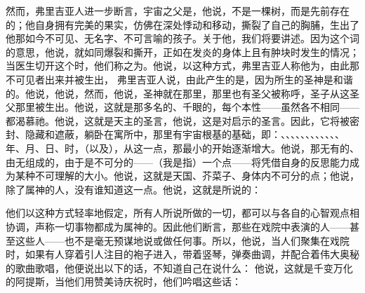 然而，弗里吉亚人进一步断言，宇宙之父是，他说，不是一棵树，而是先前存在的；他自身拥有完美的果实，仿佛在深处悸动和移动，撕裂了自己的胸脯，生出了他那如今不可见、无名字、不可言喻的孩子。关于他，我们将要讲述。因为这个词的意思，他说，就如同爆裂和撕开，正如在发炎的身体上且有肿块时发生的情况；当医生切开这个时，他们称之为。他说，以这种方式，弗里吉亚人称他为，由此那不可见者出来并被生出， 弗里吉亚人说，由此产生的是，因为所生的圣神是和谐的。他说，他说，然而，他说，圣神就在那里，那里也有圣父被称呼，圣子从这圣父那里被生出。他说，这就是那多名的、千眼的，每个本性——虽然各不相同——都渴慕祂。他说，这就是天主的圣言，他说，这是对启示的圣言。因此，它将被密封、隐藏和遮蔽，躺卧在寓所中，那里有宇宙根基的基础，即：、、、、、、、、、、、、年、月、日、时，（以及），从这一点，那最小的开始逐渐增大。他说，那无有的、由无组成的，由于是不可分的——（我是指）一个点——将凭借自身的反思能力成为某种不可理解的大小。他说，这就是天国、芥菜子、身体内不可分的点；他说，除了属神的人，没有谁知道这一点。他说，这就是所说的：\par

他们以这种方式轻率地假定，所有人所说所做的一切，都可以与各自的心智观点相协调，声称一切事物都成为属神的。因此他们断言，那些在戏院中表演的人——甚至这些人——也不是毫无预谋地说或做任何事。所以，他说，当人们聚集在戏院时，如果有人穿着引人注目的袍子进入，带着竖琴，弹奏曲调，并配合着伟大奥秘的歌曲歌唱，他便说出以下的话，不知道自己在说什么： 他说，这就是千变万化的阿提斯，当他们用赞美诗庆祝时，他们吟唱这些话：\par

